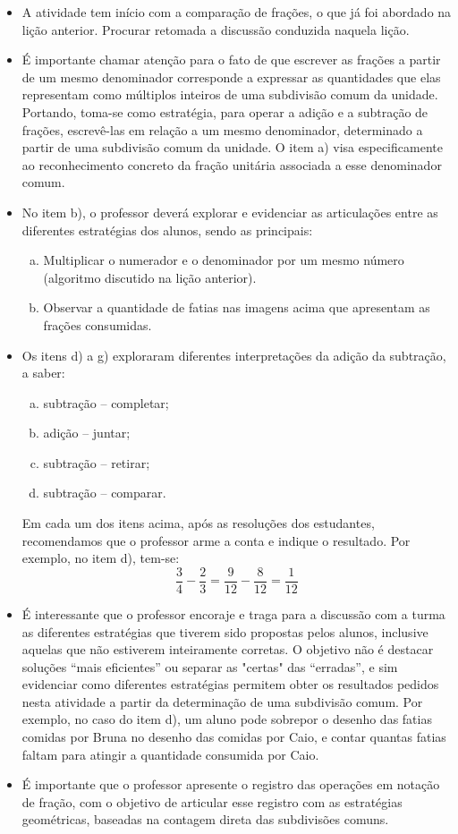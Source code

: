 \begin{multicols}{2}
\begin{itemize}
   \item  A atividade tem início com a comparação de frações, o que já foi abordado na lição anterior. Procurar retomada a discussão conduzida naquela lição.
   \item  É importante chamar atenção para o fato de que escrever as frações a partir de um mesmo denominador corresponde a expressar as quantidades que elas representam como múltiplos inteiros de uma subdivisão comum da unidade. Portando, toma-se como estratégia, para operar a adição e a subtração de frações, escrevê-las em relação a um mesmo denominador, determinado a partir de uma subdivisão comum da unidade. O item a) visa especificamente ao reconhecimento concreto da fração unitária associada a esse denominador comum.
   \item  No item b), o professor deverá explorar e evidenciar as articulações entre as diferentes estratégias dos alunos, sendo as principais:
   \begin{enumerate}[a)]
   \item  Multiplicar o numerador e o denominador por um mesmo número (algoritmo discutido na lição anterior).
   \item  Observar a quantidade de fatias nas imagens acima que apresentam as frações consumidas.
   \end{enumerate} 
   \item  Os itens d) a g) exploraram diferentes interpretações da adição da subtração, a saber:
   \begin{enumerate}[a)]
\item subtração – completar;
\item adição – juntar;
\item subtração – retirar;
\item subtração – comparar.
   \end{enumerate}

Em cada um dos itens acima, após as resoluções dos estudantes, recomendamos que o professor arme a conta e indique o resultado. Por exemplo, no item d), tem-se: 
$$\frac{3}{4} - \frac{2}{3} = \frac{9}{12} - \frac{8}{12}=\frac{1}{12}$$
  \item   É interessante que o professor encoraje e traga para a discussão com a turma as diferentes estratégias que tiverem sido propostas pelos alunos, inclusive aquelas que não estiverem inteiramente corretas. O objetivo não é destacar soluções ``mais eficientes'' ou separar as "certas" das ``erradas'', e sim evidenciar como diferentes estratégias permitem obter os resultados pedidos nesta atividade a partir da determinação de uma subdivisão comum. Por exemplo, no caso do item d), um aluno pode sobrepor o desenho das fatias comidas por Bruna no desenho das comidas por Caio, e contar quantas fatias faltam para atingir a quantidade consumida por Caio.
  \item  É importante que o professor apresente o registro das operações em notação de fração, com o objetivo de articular esse registro com as estratégias geométricas, baseadas na contagem direta das subdivisões comuns.


\end{itemize}
\end{multicols}
